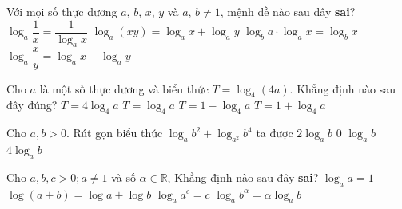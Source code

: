 

\begin{ex}%
	Với mọi số thực dương $a$, $b$, $x$, $y$  và $a$, $b\ne 1$, mệnh đề nào sau đây {\bf sai}?
	\choice 
		{\True  $\log_a\dfrac{1}{x}=\dfrac{1}{\log_ax}$}
		{$\log_a\left(xy\right)=\log_ax+\log_ay$} 
		 {$\log_ba \cdot \log_ax=\log_bx$}
		 {$\log_a\dfrac{x}{y}=\log_ax-\log_ay$}
\end{ex}

\begin{ex}%
	Cho $a$ là một số thực dương và biểu thức $T= \log_4(4a)$. Khẳng định nào sau đây  đúng?
	\choice 
		{$T = 4\log_4 a$} 
		{$T =  \log_4 a$}
		{$T  = 1-\log_4 a$}
		{\True $T  = 1+\log_4 a$}
\end{ex}

\begin{ex}%
	Cho $ a,b > 0$. Rút gọn biểu thức $\log_a{b^2}+\log_{a^2}{b^4}$  ta được
	 \choice
		{$ 2\log_ab$} 
		 {$ 0$}
		 {$\log_ab$}
		 {\True $ 4\log_ab$}
\end{ex}

\begin{ex}%
	Cho $a, b, c > 0; a \neq 1$ và số $\alpha \in \mathbb{R}$, Khẳng định nào sau đây  \textbf{sai}?
	\choice 
		 {$\log_a a=1$}
		{\True $\log  (a+b)=\log a+\log b$}
		{$\log_a a^c=c$} 
		{$\log_a b^{\alpha}=\alpha \log_a b$} 
\end{ex}

